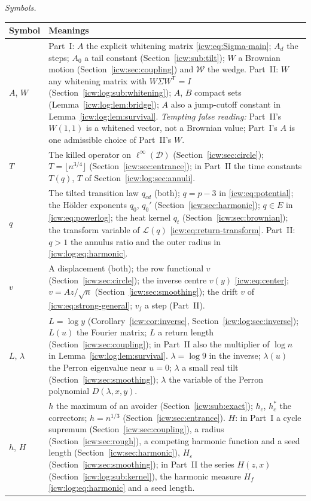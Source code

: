 \documentclass[11pt,letterpaper]{article}
\theoremstyle{remark}\newtheorem{remark}[theorem]{Remark}
\newcommand{\eps}{\varepsilon}
\newcommand{\1}{\mathbf1}
\newcommand{\Wedge}{\mathcal W}
\begin{document}
\emph{Symbols.}
\begingroup\small
\begin{longtable}{@{}>{\raggedright\arraybackslash}p{} >{\raggedright\arraybackslash}p{}@{}}
\toprule
Symbol & Meanings\\
\midrule
\endhead
$A$, $W$ & Part~I: $A$ the explicit whitening matrix \eqref{icw:eq:Sigma-main}; $A_d$ the steps; $A_0$ a tail constant (Section~\ref{icw:sub:tilt}); $W$ a Brownian motion (Section~\ref{icw:sec:coupling}) and $\Wedge$ the wedge. Part~II: $W$ any whitening matrix with $W\Sigma W^{\mathsf T}=I$ (Section~\ref{icw:log:sub:whitening}); $A$, $B$ compact sets (Lemma~\ref{icw:log:lem:bridge}); $A$ also a jump-cutoff constant in Lemma~\ref{icw:log:lem:survival}. \emph{Tempting false reading:} Part~II's $W(1,1)$ is a whitened vector, not a Brownian value; Part~I's $A$ is one admissible choice of Part~II's $W$.\\
$T$ & The killed operator on $\ell^\infty(\mathcal D)$ (Section~\ref{icw:sec:circle}); $T=\lfloor n^{3/4}\rfloor$ (Section~\ref{icw:sec:entrance}); in Part~II the time constants $T(q)$, $T$ of Section~\ref{icw:log:sec:annuli}.\\
$q$ & The tilted transition law $q_{cd}$ (both); $q=p-3$ in \eqref{icw:eq:potential}; the H\"older exponents $q_0$, $q_0'$ (Section~\ref{icw:sec:harmonic}); $q\in E$ in \eqref{icw:eq:powerlog}; the heat kernel $q_t$ (Section~\ref{icw:sec:brownian}); the transform variable of $\mathcal L(q)$ \eqref{icw:eq:return-transform}. Part~II: $q>1$ the annulus ratio and the outer radius in \eqref{icw:log:eq:harmonic}.\\
$v$ & A displacement (both); the row functional $v$ (Section~\ref{icw:sec:circle}); the inverse centre $v(y)$ \eqref{icw:eq:center}; $v=Az/\sqrt n$ (Section~\ref{icw:sec:smoothing}); the drift $v$ of \eqref{icw:eq:strong-general}; $v_j$ a step (Part~II).\\
$L$, $\lambda$ & $L=\log y$ (Corollary~\ref{icw:cor:inverse}, Section~\ref{icw:log:sec:inverse}); $L(u)$ the Fourier matrix; $L$ a return length (Section~\ref{icw:sec:coupling}); in Part~II also the multiplier of $\log n$ in Lemma~\ref{icw:log:lem:survival}. $\lambda=\log9$ in the inverse; $\lambda(u)$ the Perron eigenvalue near $u=0$; $\lambda$ a small real tilt (Section~\ref{icw:sec:smoothing}); $\lambda$ the variable of the Perron polynomial $D(\lambda,x,y)$.\\
$h$, $H$ & $h$ the maximum of an avoider (Section~\ref{icw:sub:exact}); $h_c$, $h^*_c$ the correctors; $h=n^{1/3}$ (Section~\ref{icw:sec:entrance}). $H$: in Part~I a cycle supremum (Section~\ref{icw:sec:coupling}), a radius (Section~\ref{icw:sec:rough}), a competing harmonic function and a seed length (Section~\ref{icw:sec:harmonic}), $H_\eps$ (Section~\ref{icw:sec:smoothing}); in Part~II the series $H(z,x)$ (Section~\ref{icw:log:sub:kernel}), the harmonic measure $H_f$ \eqref{icw:log:eq:harmonic} and a seed length.\\

\end{longtable}
\end{document}

